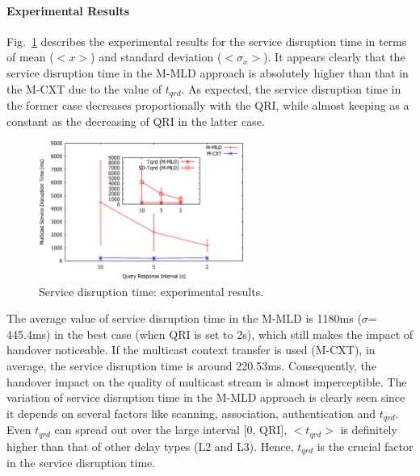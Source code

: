 \paragraph{Experimental Results} Fig.~\ref{fig:c6_simulation_result} describes the experimental results for the service disruption time in terms of mean ($<x>$) and standard deviation ($<\sigma_{x}>$). It appears clearly that the service disruption time in the M-MLD approach is absolutely higher than that in the M-CXT due to the value of $t_{qrd}$. As expected, the service disruption time in the former case decreases proportionally with the QRI, while almost keeping as a constant as the decreasing of QRI in the latter case. 
\begin{figure}[h!] 
 \begin{center} 
 \includegraphics[width=0.60\textwidth]{./Part2/Chapter4/figures/c6_simulation_result.eps} 
    \caption[The multicast service disruption time: experimental results.]{Service disruption time: experimental results.}
     \label{fig:c6_simulation_result}
  \end{center} 
\end{figure}
The average value of service disruption time in the M-MLD is 1180ms ($\sigma$= 445.4ms) in the best case (when QRI is set to 2s), which still makes the impact of handover noticeable. If the multicast context transfer is used (M-CXT), in average, the service disruption time is around 220.53ms. Consequently, the handover impact on the quality of multicast stream is almost imperceptible. The variation of service disruption time in the M-MLD approach is clearly seen since it depends on several factors like scanning, association, authentication and $t_{qrd}$. Even $t_{qrd}$ can spread out over the large interval [0, QRI], $<t_{qrd}>$ is definitely higher than that of other delay types (L2 and L3). Hence, $t_{qrd}$ is the crucial factor in the service disruption time.
